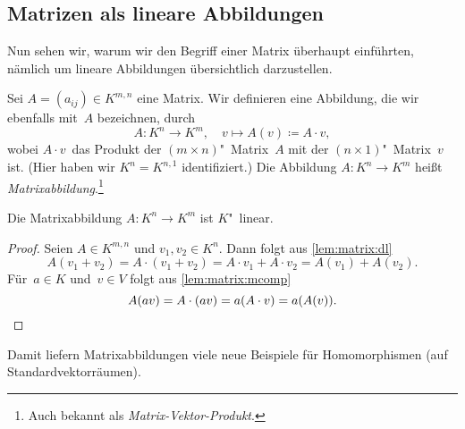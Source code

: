 \documentclass[a4paper]{article}
\begin{document}
\subsection{Matrizen als lineare Abbildungen}

Nun sehen wir, warum wir den Begriff einer Matrix überhaupt einführten, nämlich um lineare Abbildungen übersichtlich darzustellen.

\begin{definition}[Matrixabbildung]
    Sei $A = (a_{ij}) \in K^{m,n}$ eine Matrix. Wir definieren eine Abbildung, die wir ebenfalls mit~$A$ bezeichnen, durch
    \begin{equation*}
        A\colon K^n \to K^m,\quad v \mapsto A(v) \coloneqq A\cdot v,
    \end{equation*}
    wobei $A\cdot v$~das Produkt der $(m\times n)$"~Matrix~$A$ mit der $(n\times 1)$"~Matrix~$v$ ist. (Hier haben wir $K^n = K^{n,1}$ identifiziert.) Die Abbildung $A\colon K^n \to K^m$ heißt \emph{Matrixabbildung}.\footnote{Auch bekannt als \emph{Matrix-Vektor-Produkt}.}
\end{definition}

\begin{lemma}\label{lem:matrixtransformation}
    Die Matrixabbildung $A\colon K^n \to K^m$ ist $K$"~linear.
\end{lemma}

\begin{proof}
    Seien $A \in K^{m,n}$ und $v_1,v_2 \in K^n$. Dann folgt aus \cref{lem:matrix:dl}
    \begin{equation*}
        A(v_1+v_2) = A \cdot (v_1+v_2) = A\cdot v_1 + A\cdot v_2 = A(v_1)+A(v_2).
    \end{equation*}
    Für~$a \in K$ und~$v \in V$ folgt aus \cref{lem:matrix:mcomp}
    \begin{equation*}
        A(av) = A \cdot (av) = a(A\cdot v) = a(A(v)). \qedhere
    \end{equation*}
\end{proof}

Damit liefern Matrixabbildungen viele neue Beispiele für Homomorphismen (auf Standardvektorräumen).
\end{document}
